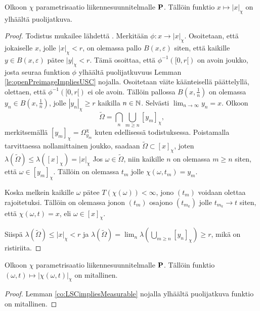 \documentclass[12pt,oneside,a4paper]{amsbook} %
\begin{document}
\begin{lemma}\label{le:multiplicityUSC}
    Olkoon $\chi$ parametrisaatio liikennesuunnitelmalle $\P$. Tällöin funktio $x \mapsto |x|_\chi$ on ylhäältä puolijatkuva.
\end{lemma}
\begin{proof}
    Todistus mukailee lähdettä \cite[s. 32]{optimal}. Merkitään $\phi: x \to |x|_\chi$. Osoitetaan, että jokaiselle $x$, jolle $|x|_\chi < r$, on olemassa pallo $B(x, \varepsilon)$ siten, että kaikille $y \in B(x, \varepsilon)$ pätee $|y|_\chi < r$. Tämä osoittaa, että $\phi^{-1}([0, r[)$ on avoin joukko, josta seuraa funktion $\phi$ ylhäältä puolijatkuvuus Lemman \ref{le:openPreimageImpliesUSC} nojalla. Osoitetaan väite käänteisellä päättelyllä, olettaen, että $\phi^{-1}([0, r[)$ ei ole avoin. Tällöin pallossa $B(x, \frac{1}{n})$ on olemassa $y_n \in B(x, \frac{1}{n})$, jolle $|y_n|_\chi \ge r$ kaikilla $n\in \N$. Selvästi $\lim_{n\to\infty} y_n = x$. Olkoon
    \begin{equation*}
        \tilde{\Omega} = \bigcap_n \bigcup_{m \ge n} [y_m]_\chi,
    \end{equation*}
    merkitsemällä $[y_m]_\chi = \Omega_{y_m}^\chi$ kuten edellisessä todistuksessa. Poistamalla tarvittaessa nollamittainen joukko, saadaan $\tilde{\Omega} \subset [x]_\chi$, joten $\lambda(\tilde{\Omega}) \le \lambda([x]_\chi) = |x|_\chi$ Jos $\omega \in \tilde{\Omega}$, niin kaikille $n$ on olemassa $m \ge n$ siten, että $\omega \in [y_m]_\chi$. Tällöin on olemassa $t_m$ jolle $\chi(\omega, t_m) = y_m$. 
    
    Koska melkein kaikille $\omega$ pätee $T(\chi(\omega)) < \infty$, jono $(t_m)$ voidaan olettaa rajoitetuksi. Tällöin on olemassa jonon $(t_m)$ osajono $(t_{m_k})$ jolle $t_{m_k} \to t$ siten, että $\chi(\omega, t) = x$, eli $\omega \in [x]_\chi$. 
    
    Siispä $\lambda(\tilde{\Omega}) \le |x|_\chi < r$ ja $\lambda(\tilde{\Omega}) = \lim_n \lambda(\bigcup_{m \ge n} [y_n]_\chi) \ge r$, mikä on ristiriita.
\end{proof}

\begin{corollary}
    Olkoon $\chi$ parametrisaatio
    liikennesuunnitelmalle $\P$. Tällöin funktio $(\omega, t) \mapsto |\chi(\omega, t)|_\chi$ on mitallinen.
\end{corollary}
\begin{proof}
    Lemman \ref{co:LSCimpliesMeasurable} nojalla ylhäältä puolijatkuva funktio on mitallinen.
\end{proof}
\end{document}
